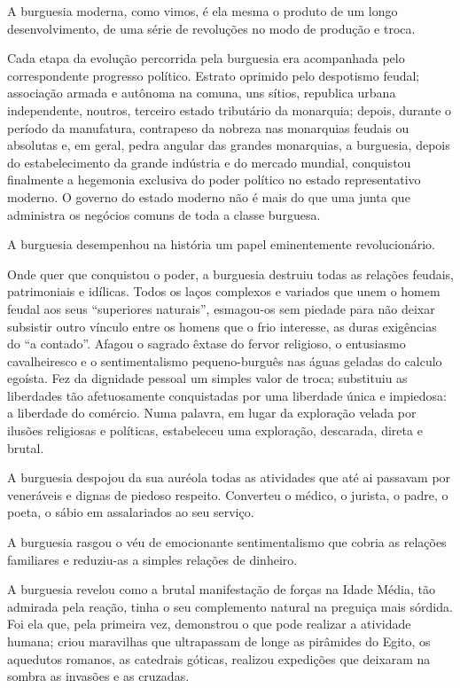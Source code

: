 A burguesia moderna, como vimos, é ela mesma o produto de um longo
desenvolvimento, de uma série de revoluções no modo de produção e
troca.

Cada etapa da evolução percorrida pela burguesia era acompanhada pelo
correspondente progresso político. Estrato oprimido pelo despotismo
feudal; associação armada e autônoma na comuna, uns sítios, republica
urbana independente, noutros, terceiro estado tributário da
monarquia; depois, durante o período da manufatura, contrapeso da
nobreza nas monarquias feudais ou absolutas e, em geral, pedra angular
das grandes monarquias, a burguesia, depois do estabelecimento da
grande indústria e do mercado mundial, conquistou finalmente a
hegemonia exclusiva do poder político no estado representativo
moderno. O governo do estado moderno não é mais do que uma junta que
administra os negócios comuns de toda a classe burguesa.

A burguesia desempenhou na história um papel eminentemente
revolucionário.

Onde quer que conquistou o poder, a burguesia destruiu todas as
relações feudais, patrimoniais e idílicas. Todos os laços complexos e
variados que unem o homem feudal aos seus ``superiores naturais'',
esmagou-os sem piedade para não deixar subsistir outro vínculo entre
os homens que o frio interesse, as duras exigências do ``a
contado''. Afagou o sagrado êxtase do fervor religioso, o entusiasmo
cavalheiresco e o sentimentalismo pequeno-burguês nas águas geladas do
calculo egoísta. Fez da dignidade pessoal um simples valor de troca;
substituiu as liberdades tão afetuosamente conquistadas por uma
liberdade única e impiedosa: a liberdade do comércio. Numa palavra, em
lugar da exploração velada por ilusões religiosas e políticas,
estabeleceu uma exploração, descarada, direta e brutal.

A burguesia despojou da sua auréola todas as atividades que até ai
passavam por veneráveis e dignas de piedoso respeito. Converteu o
médico, o jurista, o padre, o poeta, o sábio em assalariados ao seu
serviço.

A burguesia rasgou o véu de emocionante sentimentalismo que cobria as
relações familiares e reduziu-as a simples relações de dinheiro.

A burguesia revelou como a brutal manifestação de forças na Idade
Média, tão admirada pela reação, tinha o seu complemento natural na
preguiça mais sórdida. Foi ela que, pela primeira vez, demonstrou o
que pode realizar a atividade humana; criou maravilhas que ultrapassam
de longe as pirâmides do Egito, os aquedutos romanos, as catedrais
góticas, realizou expedições que deixaram na sombra as invasões e as
cruzadas.

